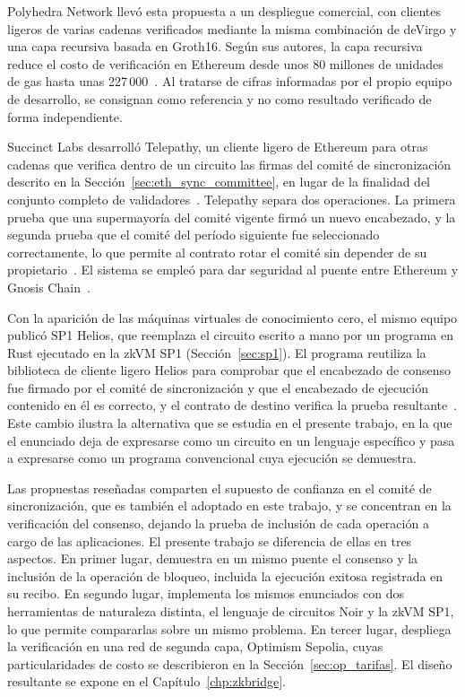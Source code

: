 Polyhedra Network llevó esta propuesta a un despliegue comercial, con clientes ligeros de varias
cadenas verificados mediante la misma combinación de deVirgo y una capa recursiva basada en
Groth16. Según sus autores, la capa recursiva reduce el costo de verificación en Ethereum desde
unos 80 millones de unidades de gas hasta unas 227\,000~\cite{polyhedrazkbridge}. Al tratarse de
cifras informadas por el propio equipo de desarrollo, se consignan como referencia y no como
resultado verificado de forma independiente.

Succinct Labs desarrolló Telepathy, un cliente ligero de Ethereum para otras cadenas que verifica
dentro de un circuito las firmas del comité de sincronización descrito en la
Sección~\ref{sec:eth_sync_committee}, en lugar de la finalidad del conjunto completo de
validadores~\cite{succinctproofconsensus, telepathydocs}. Telepathy separa dos operaciones. La
primera prueba que una supermayoría del comité vigente firmó un nuevo encabezado, y la segunda
prueba que el comité del período siguiente fue seleccionado correctamente, lo que permite al
contrato rotar el comité sin depender de su propietario~\cite{telepathydocs}. El sistema se empleó
para dar seguridad al puente entre Ethereum y Gnosis Chain~\cite{succinctproofconsensus}.

Con la aparición de las máquinas virtuales de conocimiento cero, el mismo equipo publicó SP1
Helios, que reemplaza el circuito escrito a mano por un programa en Rust ejecutado en la zkVM SP1
(Sección~\ref{sec:sp1}). El programa reutiliza la biblioteca de cliente ligero Helios para
comprobar que el encabezado de consenso fue firmado por el comité de sincronización y que el
encabezado de ejecución contenido en él es correcto, y el contrato de destino verifica la prueba
resultante~\cite{sp1helios}. Este cambio ilustra la alternativa que se estudia en el presente
trabajo, en la que el enunciado deja de expresarse como un circuito en un lenguaje específico y
pasa a expresarse como un programa convencional cuya ejecución se demuestra.

Las propuestas reseñadas comparten el supuesto de confianza en el comité de sincronización, que
es también el adoptado en este trabajo, y se concentran en la verificación del consenso, dejando
la prueba de inclusión de cada operación a cargo de las aplicaciones. El presente trabajo se
diferencia de ellas en tres aspectos. En primer lugar, demuestra en un mismo puente el consenso y
la inclusión de la operación de bloqueo, incluida la ejecución exitosa registrada en su recibo.
En segundo lugar, implementa los mismos enunciados con dos herramientas de naturaleza distinta,
el lenguaje de circuitos Noir y la zkVM SP1, lo que permite compararlas sobre un mismo problema.
En tercer lugar, despliega la verificación en una red de segunda capa, Optimism Sepolia, cuyas
particularidades de costo se describieron en la Sección~\ref{sec:op_tarifas}. El diseño
resultante se expone en el Capítulo~\ref{chp:zkbridge}.
